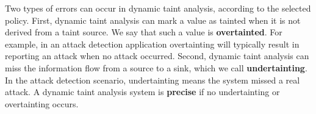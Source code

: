 Two types of errors can occur in dynamic taint analysis, according to the selected policy. First, dynamic taint analysis can mark a value as tainted when it is not derived from a taint source. We say that such a value is \textbf{overtainted}. For example, in an attack detection application overtainting will typically result in reporting an attack when no attack occurred. Second, dynamic taint analysis can miss the information flow from a source to a sink, which we call \textbf{undertainting}. In the attack detection scenario, undertainting means the system missed a real attack. A dynamic taint analysis system is \textbf{precise} if no undertainting or overtainting occurs.